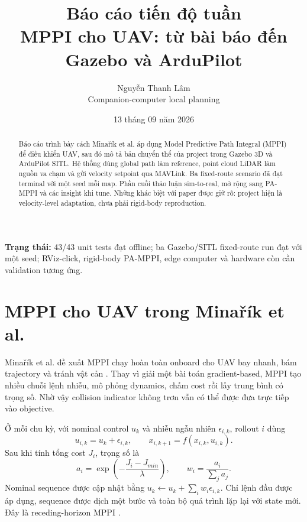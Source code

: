 \documentclass[10pt,a4paper]{article}
\title{\vspace{-2.2em}\textbf{Báo cáo tiến độ tuần\\
MPPI cho UAV: từ bài báo đến Gazebo và ArduPilot}}
\author{Nguyễn Thanh Lâm\\[-0.1em]
\small Companion-computer local planning}
\date{13 tháng 09 năm 2026}
\begin{document}
\maketitle
\vspace{-1.7em}

\begin{center}
\end{center}

\begin{abstract}
Báo cáo trình bày cách Minařík et al. áp dụng Model Predictive Path Integral
(MPPI) để điều khiển UAV, sau đó mô tả bản chuyển thể của project trong Gazebo
3D và ArduPilot SITL. Hệ thống dùng global path làm reference, point cloud LiDAR
làm nguồn va chạm và gửi velocity setpoint qua MAVLink. Ba fixed-route scenario
đã đạt terminal với một seed mỗi map. Phần cuối thảo luận sim-to-real, mở rộng
sang PA-MPPI và các insight khi tune. Những khác biệt với paper được giữ rõ:
project hiện là velocity-level adaptation, chưa phải rigid-body reproduction.
\end{abstract}

\noindent\textbf{Trạng thái:} 43/43 unit tests đạt offline; ba Gazebo/SITL
fixed-route run đạt với một seed; RViz-click, rigid-body PA-MPPI, edge computer
và hardware còn cần validation tương ứng.

\section{MPPI cho UAV trong Minařík et al.}

Minařík et al. đề xuất MPPI chạy hoàn toàn onboard cho UAV bay nhanh, bám
trajectory và tránh vật cản \cite{minarik2024agilemppi}. Thay vì giải một bài
toán gradient-based, MPPI tạo nhiều chuỗi lệnh nhiễu, mô phỏng dynamics, chấm
cost rồi lấy trung bình có trọng số. Nhờ vậy collision indicator không trơn vẫn
có thể được đưa trực tiếp vào objective.

Ở mỗi chu kỳ, với nominal control $u_k$ và nhiễu ngẫu nhiên $\epsilon_{i,k}$,
rollout $i$ dùng
\begin{equation}
u_{i,k}=u_k+\epsilon_{i,k},\qquad
x_{i,k+1}=f(x_{i,k},u_{i,k}).
\end{equation}
Sau khi tính tổng cost $J_i$, trọng số là
\begin{equation}
a_i=\exp\!\left(-\frac{J_i-J_{min}}{\lambda}\right),
\qquad w_i=\frac{a_i}{\sum_j a_j}.
\end{equation}
Nominal sequence được cập nhật bằng $u_k\leftarrow u_k+\sum_iw_i\epsilon_{i,k}$.
Chỉ lệnh đầu được áp dụng, sequence được dịch một bước và toàn bộ quá trình lặp
lại với state mới. Đây là receding-horizon MPPI \cite{williams2018itmppi}.
\end{document}
